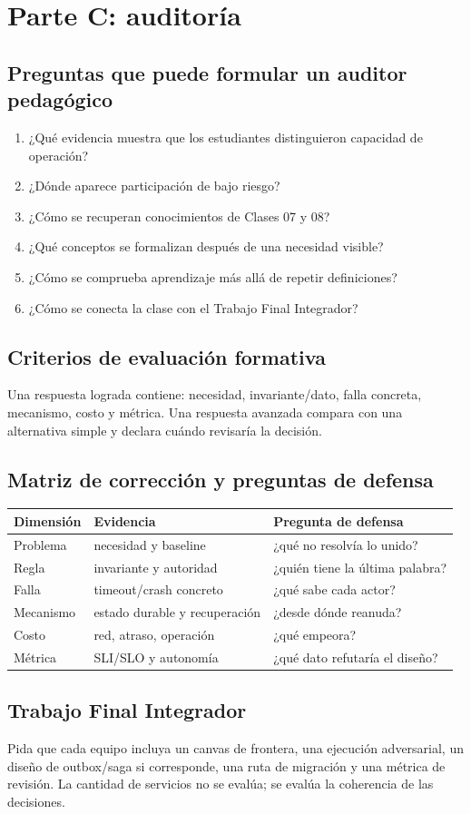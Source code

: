 \documentclass[variant=docente,cover=institutional,mode=screen]{ua-engineering-v6-article}
\begin{document}
\section{Parte C: auditoría}

\subsection{Preguntas que puede formular un auditor pedagógico}
\begin{enumerate}
\item ¿Qué evidencia muestra que los estudiantes distinguieron capacidad de operación?
\item ¿Dónde aparece participación de bajo riesgo?
\item ¿Cómo se recuperan conocimientos de Clases 07 y 08?
\item ¿Qué conceptos se formalizan después de una necesidad visible?
\item ¿Cómo se comprueba aprendizaje más allá de repetir definiciones?
\item ¿Cómo se conecta la clase con el Trabajo Final Integrador?
\end{enumerate}

\subsection{Criterios de evaluación formativa}
Una respuesta lograda contiene: necesidad, invariante/dato, falla concreta, mecanismo, costo y métrica. Una respuesta avanzada compara con una alternativa simple y declara cuándo revisaría la decisión.

\subsection{Matriz de corrección y preguntas de defensa}
\begin{center}
\begin{tabular}{p{}p{}p{}}
\toprule
\textbf{Dimensión} & \textbf{Evidencia} & \textbf{Pregunta de defensa} \\
\midrule
Problema & necesidad y baseline & ¿qué no resolvía lo unido? \\
Regla & invariante y autoridad & ¿quién tiene la última palabra? \\
Falla & timeout/crash concreto & ¿qué sabe cada actor? \\
Mecanismo & estado durable y recuperación & ¿desde dónde reanuda? \\
Costo & red, atraso, operación & ¿qué empeora? \\
Métrica & SLI/SLO y autonomía & ¿qué dato refutaría el diseño? \\
\bottomrule
\end{tabular}
\end{center}

\subsection{Trabajo Final Integrador}
Pida que cada equipo incluya un canvas de frontera, una ejecución adversarial, un diseño de outbox/saga si corresponde, una ruta de migración y una métrica de revisión. La cantidad de servicios no se evalúa; se evalúa la coherencia de las decisiones.
\end{document}
